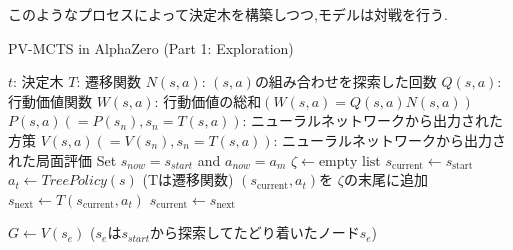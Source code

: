 	
このようなプロセスによって決定木を構築しつつ,モデルは対戦を行う.
\newpage
\begin{algorithm}
    \caption{PV-MCTS in AlphaZero (Part 1: Exploration)}
    \label{alg:mcts-1}
    \begin{algorithmic}[1]
        \State $t$: 決定木
        \State $T$: 遷移関数
        \State $N(s, a)$: $(s, a)$の組み合わせを探索した回数
        \State $Q(s, a)$: 行動価値関数 
        \State $W(s, a)$: 行動価値の総和$(W(s, a)=Q(s, a)N(s, a))$
        \State $P(s, a)(=P(s_n), s_n=T(s, a))$: 
        \State ニューラルネットワークから出力された方策
        \State $V(s, a)(=V(s_n), s_n=T(s, a))$: 
        \State ニューラルネットワークから出力された局面評価
            \State Set $s_{now} = s_{start}$ and $a_{now} = a_m$
                \State $\zeta \gets \textrm{empty list}$
                \State $s_{\text{current}} \gets s_{\text{start}}$
                    \State $a_t \gets TreePolicy(s)$
                    \State (Tは遷移関数)
                    \State $(s_{\text{current}}, a_t)$を $\zeta $の末尾に追加
                    \State $s_{\text{next}} \gets T(s_{\text{current}}, a_t)$
                    \State $s_{\text{current}} \gets s_{\text{next}}$
                    
                \EndWhile
                \State $G \gets V(s_e)$ 
                \State($s_e$は$s_{start}$から探索してたどり着いたノード$s_e$)
                \State {}
            \EndFor
        \EndFunction
        
        
    \end{algorithmic}
\end{algorithm}

